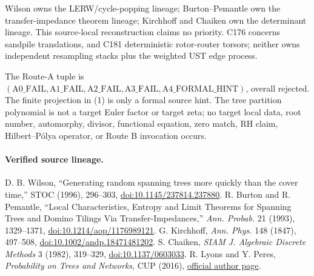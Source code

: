 \documentclass[10pt]{article}
\begin{document}
Wilson owns the LERW/cycle-popping lineage; Burton--Pemantle own the
transfer-impedance theorem lineage; Kirchhoff and Chaiken own the determinant
lineage.  This source-local reconstruction claims no priority.  C176 concerns
sandpile translations, and C181 deterministic rotor-router torsors; neither
owns independent resampling stacks plus the weighted UST edge process.

The Route-A tuple is $(\mathrm{A0\_FAIL},\mathrm{A1\_FAIL},
\mathrm{A2\_FAIL},\mathrm{A3\_FAIL},\mathrm{A4\_FORMAL\_HINT})$, overall
rejected.  The finite projection in (1) is only a formal source hint.  The
tree partition polynomial is not a target Euler factor or target zeta; no
target local data, root number, automorphy, divisor, functional equation,
zero match, RH claim, Hilbert--P\'olya operator, or Route B invocation occurs.
\fi

\paragraph{Verified source lineage.}
\scriptsize\raggedright
D. B. Wilson, ``Generating random spanning trees more quickly than the cover
time,'' STOC (1996), 296--303,
\href{https://doi.org/10.1145/237814.237880}{doi:10.1145/237814.237880}.
R. Burton and R. Pemantle, ``Local Characteristics, Entropy and Limit Theorems
for Spanning Trees and Domino Tilings Via Transfer-Impedances,'' \emph{Ann.
Probab.} 21 (1993), 1329--1371,
\href{https://doi.org/10.1214/aop/1176989121}{doi:10.1214/aop/1176989121}.
G. Kirchhoff, \emph{Ann. Phys.} 148 (1847), 497--508,
\href{https://doi.org/10.1002/andp.18471481202}{doi:10.1002/andp.18471481202}.
S. Chaiken, \emph{SIAM J. Algebraic Discrete Methods} 3 (1982), 319--329,
\href{https://doi.org/10.1137/0603033}{doi:10.1137/0603033}.
R. Lyons and Y. Peres, \emph{Probability on Trees and Networks}, CUP (2016),
\href{https://rdlyons.pages.iu.edu/prbtree/}{official author page}.
\end{document}
